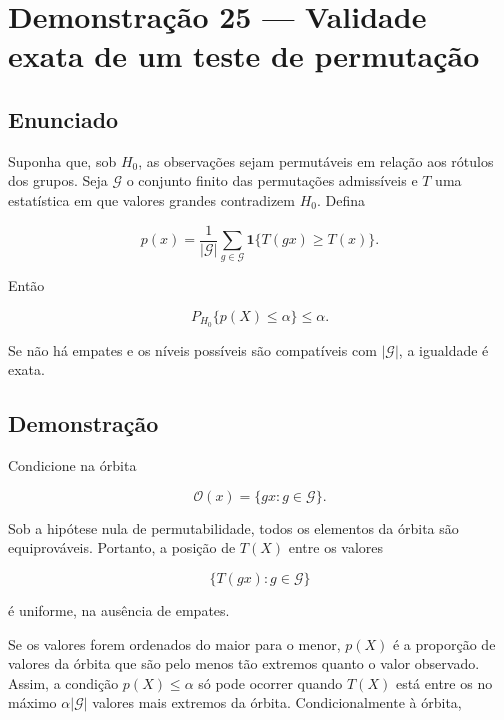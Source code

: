\documentclass[
  letterpaper,
  DIV=11,
  numbers=noendperiod]{scrreprt}
\begin{document}
\section*{Demonstração 25 --- Validade exata de um teste de
permutação}\label{demonstrauxe7uxe3o-25-validade-exata-de-um-teste-de-permutauxe7uxe3o}


\subsection*{Enunciado}\label{enunciado-21}

Suponha que, sob \(H_0\), as observações sejam permutáveis em relação
aos rótulos dos grupos. Seja \(\mathcal G\) o conjunto finito das
permutações admissíveis e \(T\) uma estatística em que valores grandes
contradizem \(H_0\). Defina

\[
p(x)
=
\frac{1}{|\mathcal G|}
\sum_{g\in\mathcal G}
\mathbf 1\{T(gx)\geq T(x)\}.
\]

Então

\[
P_{H_0}\{p(X)\leq\alpha\}
\leq\alpha.
\]

Se não há empates e os níveis possíveis são compatíveis com
\(|\mathcal G|\), a igualdade é exata.

\subsection*{Demonstração}\label{demonstrauxe7uxe3o-24}

Condicione na órbita

\[
\mathcal O(x)=\{gx:g\in\mathcal G\}.
\]

Sob a hipótese nula de permutabilidade, todos os elementos da órbita são
equiprováveis. Portanto, a posição de \(T(X)\) entre os valores

\[
\{T(gx):g\in\mathcal G\}
\]

é uniforme, na ausência de empates.

Se os valores forem ordenados do maior para o menor, \(p(X)\) é a
proporção de valores da órbita que são pelo menos tão extremos quanto o
valor observado. Assim, a condição \(p(X)\leq\alpha\) só pode ocorrer
quando \(T(X)\) está entre os no máximo \(\alpha|\mathcal G|\) valores
mais extremos da órbita. Condicionalmente à órbita,
\end{document}
